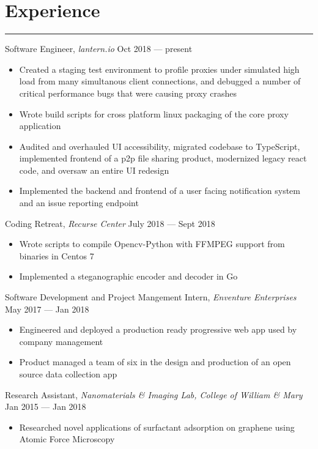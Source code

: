 \documentclass[12pt]{article}
\begin{document}
\section*{Experience}
\vspace{-0.25cm}
\hrule
\vspace{0.25cm}

\noindent Software Engineer, \textit{lantern.io} \hfill Oct 2018 --- present
\vspace{-0.1cm}
\begin{itemize}
  \itemsep-0.4em
\item Created a staging test environment to profile proxies under simulated high load from many simultanous client connections, and debugged a number of critical performance bugs that were causing proxy crashes
\item Wrote build scripts for cross platform linux packaging of the core proxy application
\item Audited and overhauled UI accessibility, migrated codebase to TypeScript, implemented frontend of a p2p file sharing product, modernized legacy react code, and oversaw an entire UI redesign
\item Implemented the backend and frontend of a user facing notification system and an issue reporting endpoint
\end{itemize}


\noindent Coding Retreat, \textit{Recurse Center} \hfill July 2018 --- Sept 2018
\vspace{-0.1cm}
\begin{itemize}
  \itemsep-0.4em
	\item Wrote scripts to compile Opencv-Python with FFMPEG support from binaries in Centos 7
        \item Implemented a steganographic encoder and decoder in Go
\end{itemize}

\noindent Software Development and Project Mangement Intern, \textit{Enventure Enterprises} \hfill May 2017 --- Jan 2018
\vspace{-0.1cm}
\begin{itemize}
  \itemsep-0.4em
	\item Engineered and deployed a production ready progressive web app used by company management
	\item Product managed a team of six in the design and production of an open source data collection app
\end{itemize}

\noindent Research Assistant, \textit{Nanomaterials \& Imaging Lab, College of William \& Mary} \hfill Jan 2015 --- Jan 2018
\vspace{-0.1cm}
\begin{itemize}
  \itemsep-0.4em
	\item Researched novel applications of surfactant adsorption on graphene using Atomic Force Microscopy
\end{itemize}
\end{document}
